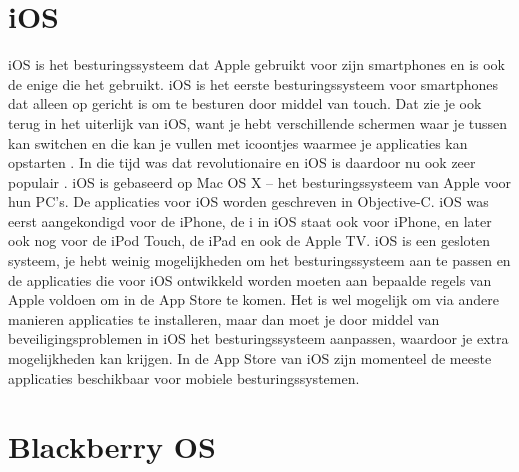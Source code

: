 \section{iOS}

iOS is het besturingssysteem dat Apple gebruikt voor zijn smartphones en is ook de enige die het gebruikt.
iOS is het eerste besturingssysteem voor smartphones dat alleen op gericht is om te besturen door middel van touch.
Dat zie je ook terug in het uiterlijk van iOS, want je hebt verschillende schermen waar je tussen kan switchen en die kan je vullen met icoontjes waarmee je applicaties kan opstarten \citep{computerworld}.
In die tijd was dat revolutionaire en iOS is daardoor nu ook zeer populair \citep{mysecondskin}.
iOS is gebaseerd op Mac OS X -- het besturingssysteem van Apple voor hun PC's.
De applicaties voor iOS worden geschreven in Objective-C.
iOS was eerst aangekondigd voor de iPhone, de i in iOS staat ook voor iPhone, en later ook nog voor de iPod Touch, de iPad en ook de Apple TV.
iOS is een gesloten systeem, je hebt weinig mogelijkheden om het besturingssysteem aan te passen en de applicaties die voor iOS ontwikkeld worden moeten aan bepaalde regels van Apple voldoen om in de App Store te komen.
Het is wel mogelijk om via andere manieren applicaties te installeren, maar dan moet je door middel van beveiligingsproblemen in iOS het besturingssysteem aanpassen, waardoor je extra mogelijkheden kan krijgen.
In de App Store van iOS zijn momenteel de meeste applicaties beschikbaar voor mobiele besturingssystemen.


\section{Blackberry OS}

